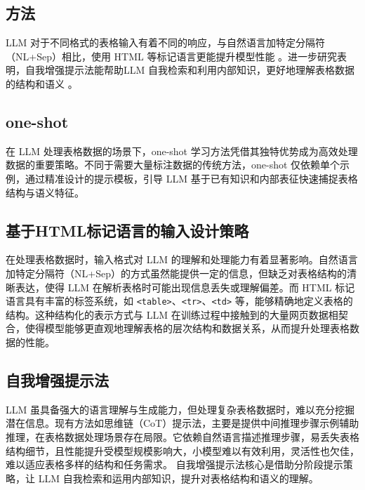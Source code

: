 \documentclass[10.5pt,compsoc]{CjC}
\theoremstyle{mystyle}
\begin{document}
    \begin{CJK*}{UTF8}{zhhei}
\vskip 1mm
\section{方法}
LLM 对于不同格式的表格输入有着不同的响应，与自然语言加特定分隔符（NL+Sep）相比，使用 HTML 等标记语言更能提升模型性能 。进一步研究表明，自我增强提示法能帮助LLM 自我检索和利用内部知识，更好地理解表格数据的结构和语义 \cite{ref1}。

{\begin{CJK*}{UTF8}{zhhei}\subsection{one-shot}\end{CJK*}}

在 LLM 处理表格数据的场景下，one-shot 学习方法凭借其独特优势成为高效处理数据的重要策略。不同于需要大量标注数据的传统方法，one-shot 仅依赖单个示例，通过精准设计的提示模板，引导 LLM 基于已有知识和内部表征快速捕捉表格结构与语义特征。


{\begin{CJK*}{UTF8}{zhhei}\subsection{基于HTML标记语言的输入设计策略}\end{CJK*}}
在处理表格数据时，输入格式对 LLM 的理解和处理能力有着显著影响。自然语言加特定分隔符（NL+Sep）的方式虽然能提供一定的信息，但缺乏对表格结构的清晰表达，使得 LLM 在解析表格时可能出现信息丢失或理解偏差。而 HTML 标记语言具有丰富的标签系统，如 \texttt{<table>}、\texttt{<tr>}、\texttt{<td>} 等，能够精确地定义表格的结构。这种结构化的表示方式与 LLM 在训练过程中接触到的大量网页数据相契合，使得模型能够更直观地理解表格的层次结构和数据关系，从而提升处理表格数据的性能。

{\begin{CJK*}{UTF8}{zhhei}\subsection{自我增强提示法}\end{CJK*}}
LLM 虽具备强大的语言理解与生成能力，但处理复杂表格数据时，难以充分挖掘潜在信息。现有方法如思维链（CoT）提示法，主要是提供中间推理步骤示例辅助推理，在表格数据处理场景存在局限。它依赖自然语言描述推理步骤，易丢失表格结构细节，且性能提升受模型规模影响大，小模型难以有效利用，灵活性也欠佳，难以适应表格多样的结构和任务需求。
自我增强提示法核心是借助分阶段提示策略，让 LLM 自我检索和运用内部知识，提升对表格结构和语义的理解。



\end{CJK*}
\end{document}
